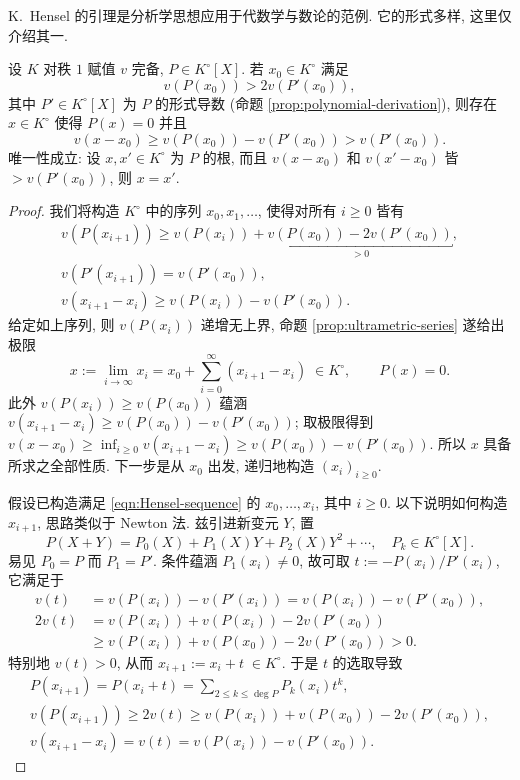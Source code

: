 K.\ Hensel 的引理是分析学思想应用于代数学与数论的范例. 它的形式多样, 这里仅介绍其一.
\begin{theorem}[Hensel 引理]\label{prop:Hensel-lemma}
	设 $K$ 对秩 $1$ 赋值 $v$ 完备, $P \in K^\circ[X]$. 若 $x_0 \in K^\circ$ 满足
	\[ v(P(x_0)) > 2v(P'(x_0)), \]
	其中 $P' \in K^\circ[X]$ 为 $P$ 的形式导数 (命题 \ref{prop:polynomial-derivation}), 则存在 $x \in K^\circ$ 使得 $P(x) = 0$ 并且
	\[ v(x - x_0) \geq v(P(x_0)) - v(P'(x_0)) > v(P'(x_0)). \]
	唯一性成立: 设 $x, x' \in K^\circ$ 为 $P$ 的根, 而且 $v(x - x_0)$ 和 $v(x' - x_0)$ 皆 $> v(P'(x_0))$, 则 $x=x'$.
\end{theorem}
\begin{proof}
	我们将构造 $K^\circ$ 中的序列 $x_0, x_1, \ldots$, 使得对所有 $i \geq 0$ 皆有
	\begin{equation}\label{eqn:Hensel-sequence} \begin{gathered}
		v(P(x_{i+1})) \geq v(P(x_i)) + \underbracket{v(P(x_0)) - 2 v(P'(x_0))}_{>0}, \\
		v(P'(x_{i+1})) = v(P'(x_0)), \\
		v(x_{i+1} - x_i) \geq v(P(x_i)) - v(P'(x_0)).
	\end{gathered}\end{equation}
	给定如上序列, 则 $v(P(x_i))$ 递增无上界, 命题 \ref{prop:ultrametric-series} 遂给出极限
	\[ x := \lim_{i \to \infty} x_i = x_0 + \sum_{i=0}^\infty (x_{i+1}-x_i)\; \in K^\circ, \qquad P(x)=0. \]
	此外 $v(P(x_i)) \geq v(P(x_0))$ 蕴涵 $v(x_{i+1} - x_i) \geq v(P(x_0)) - v(P'(x_0))$; 取极限得到 $v(x - x_0) \geq \inf_{i \geq 0} v(x_{i+1} - x_i) \geq v(P(x_0)) - v(P'(x_0))$. 所以 $x$ 具备所求之全部性质. 下一步是从 $x_0$ 出发, 递归地构造 $(x_i)_{i \geq 0}$.
	
	假设已构造满足 \eqref{eqn:Hensel-sequence} 的 $x_0, \ldots, x_i$, 其中 $i \geq 0$. 以下说明如何构造 $x_{i+1}$, 思路类似于 Newton 法. 兹引进新变元 $Y$, 置
	\[ P(X+Y) = P_0(X) + P_1(X) Y + P_2(X) Y^2 + \cdots, \quad P_k \in K^\circ[X]. \]
	易见 $P_0 = P$ 而 $P_1 = P'$. 条件蕴涵 $P_1(x_i) \neq 0$, 故可取 $t := -P(x_i)/P'(x_i)$, 它满足于
	\begin{align*}
		v(t) & = v(P(x_i)) - v(P'(x_i)) = v(P(x_i)) - v(P'(x_0)), \\
		2v(t) & = v(P(x_i)) + v(P(x_i)) - 2v(P'(x_0)) \\
		& \geq v(P(x_i)) + v(P(x_0)) - 2v(P'(x_0)) > 0.
	\end{align*}
	特别地 $v(t) > 0$, 从而 $x_{i+1} := x_i + t \;\in K^\circ$. 于是 $t$ 的选取导致
	\begin{gather*}
		P(x_{i+1}) = P(x_i + t) = \sum_{2 \leq k \leq \deg P} P_k(x_i) t^k, \\
		v(P(x_{i+1})) \geq 2v(t) \geq v(P(x_i)) + v(P(x_0)) - 2v(P'(x_0)), \\
		v(x_{i+1} - x_i) = v(t) = v(P(x_i)) - v(P'(x_0)).
	\end{gather*}
	

\end{proof}
